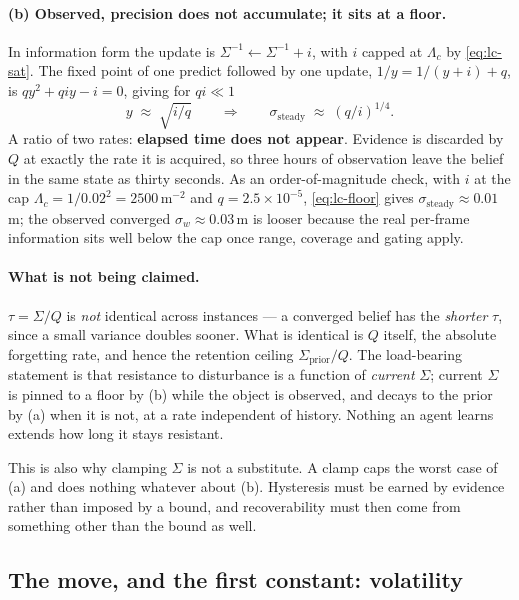 \documentclass[11pt,a4paper]{report}
\begin{document}
\paragraph{(b) Observed, precision does not accumulate; it sits at a floor.} In information form the
update is $\Sigma^{-1}\leftarrow\Sigma^{-1}+i$, with $i$ capped at $\Lambda_c$ by
\eqref{eq:lc-sat}. The fixed point of one predict followed by one update,
$1/y=1/(y+i)+q$, is $qy^2+qiy-i=0$, giving for $qi\ll1$
\begin{equation}
y\;\approx\;\sqrt{i/q}
\qquad\Longrightarrow\qquad
\sigma_{\text{steady}}\;\approx\;\left(q/i\right)^{1/4}.
\label{eq:lc-floor}
\end{equation}
A ratio of two rates: \textbf{elapsed time does not appear}. Evidence is discarded by $Q$ at exactly
the rate it is acquired, so three hours of observation leave the belief in the same state as thirty
seconds. As an order-of-magnitude check, with $i$ at the cap $\Lambda_c=1/0.02^2=2500\,\mathrm{m^{-2}}$
and $q=2.5\times10^{-5}$, \eqref{eq:lc-floor} gives $\sigma_{\text{steady}}\approx0.01$\,m; the
observed converged $\sigma_w\approx0.03$\,m is looser because the real per-frame information sits
well below the cap once range, coverage and gating apply.

\paragraph{What is not being claimed.} $\tau=\Sigma/Q$ is \emph{not} identical across instances --- a
converged belief has the \emph{shorter} $\tau$, since a small variance doubles sooner. What is
identical is $Q$ itself, the absolute forgetting rate, and hence the retention ceiling
$\Sigma_{\text{prior}}/Q$. The load-bearing statement is that resistance to disturbance is a function
of \emph{current} $\Sigma$; current $\Sigma$ is pinned to a floor by (b) while the object is
observed, and decays to the prior by (a) when it is not, at a rate independent of history. Nothing an
agent learns extends how long it stays resistant.

This is also why clamping $\Sigma$ is not a substitute. A clamp caps the worst case of (a) and does
nothing whatever about (b). Hysteresis must be earned by evidence rather than imposed by a bound,
and recoverability must then come from something other than the bound as well.

\subsection{The move, and the first constant: volatility}
\label{sec:volatility}
\end{document}
